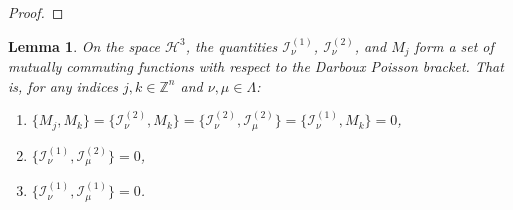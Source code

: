 \documentclass[reqno,11pt]{amsart}
\theoremstyle{plain}
\numberwithin{equation}{section}
\newtheorem{lemma}[theorem]{Lemma}
\newcommand{\Z}{\mathbb{Z}}
\renewcommand{\H}{\mathcal{H}}
\newcommand{\cI}{{\mathcal I}}
\begin{document}
{\begin{proof}
\end{proof}
	
	
	
	
	
	

\begin{lemma}\label{prop:comm_gamma2}
On the space $\H^3$, the quantities $\cI_\nu^{(1)}$, $\cI_\nu^{(2)}$, and $M_j$ form a set of mutually commuting functions with respect to the Darboux Poisson bracket. That is, for any indices $j,k\in \Z^n$ and $\nu, \mu\in \Lambda$:
\begin{enumerate}
	\item $\{M_j, M_k\} = \{\cI_\nu^{(2)}, M_k\} = \{\cI_\nu^{(2)}, \cI_\mu^{(2)}\} =\{\cI_\nu^{(1)}, M_k\} = 0$,
	\item $ \{\cI_\nu^{(1)}, \cI_\mu^{(2)}\} = 0$,
	\item $\{\cI_\nu^{(1)}, \cI_\mu^{(1)}\} = 0$.
\end{enumerate}
\end{lemma}

}
\end{document}
